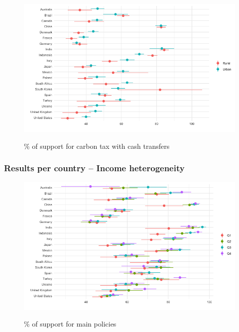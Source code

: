 \begin{frame}{}%
\begin{figure}[h!]
\caption{\% of support for carbon tax with cash transfers} %
\includegraphics[width=.7\paperwidth]{../figures/country_comparison/tax_transfers_support_urban_each_country.png} \\
\end{figure}
\end{frame}

\subsubsection{Results per country -- Income heterogeneity}

\begin{frame}{}%
\begin{figure}[h!]
\caption{\% of support for main policies} %
\includegraphics[width=.7\paperwidth]{../figures/country_comparison/main_policies_support_income_each_country.png} \\
\end{figure}
\end{frame}

